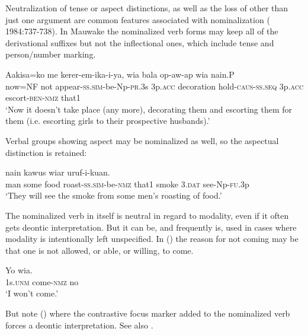 Neutralization of tense or aspect distinctions, as well as the loss of other than just one argument are common features associated with nominalization (  1984:737-738). In Mauwake the nominalized verb forms may keep all of the derivational suffixes but not the inflectional ones, which include tense and person/number marking.

\ea%
\label{ex:x1226}
\gll Aakisa=ko  me  kerer-em-ika-i-ya,  wia  bala op-aw-ap  wia    nain.P{\footnotemark} \\
     now=NF  not  appear-\textsc{ss}.\textsc{sim}-be-Np-\textsc{pr}.3s  3p.\textsc{acc}  decoration hold-\textsc{caus}-\textsc{ss}.\textsc{seq}  3p.\textsc{acc}  escort-\textsc{ben}-\textsc{nmz}  that1 \\
\glt `Now it doesn't take place (any more), decorating them and escorting them for them (i.e. escorting girls to their prospective husbands).'
\z
{}

Verbal groups showing aspect may be nominalized as well, so the aspectual distinction is retained: 

\ea%
\label{ex:x1841}
  nain  kawus  wiar uruf-i-kuan. \\
     man  some  food  roast-\textsc{ss}.\textsc{sim}-be-\textsc{nmz}  that1  smoke  3.\textsc{dat} see-Np-\textsc{fu}.3p \\
\glt `They will see the smoke from some men's roasting of food.'
\z

The nominalized verb in itself is neutral in regard to modality, even if it often gets deontic interpretation. But it can be, and frequently is, used in cases where modality is intentionally left unspecified. In () the reason for not coming may be that one is not allowed, or able, or willing, to come. 

\ea%
\label{ex:x1257}
\gll Yo    wia. \\
     1s.\textsc{unm}  come-\textsc{nmz}  no \\
\glt `I won't come.'
\z

But note () where the contrastive focus marker added to the nominalized verb forces a deontic interpretation. See also . 

